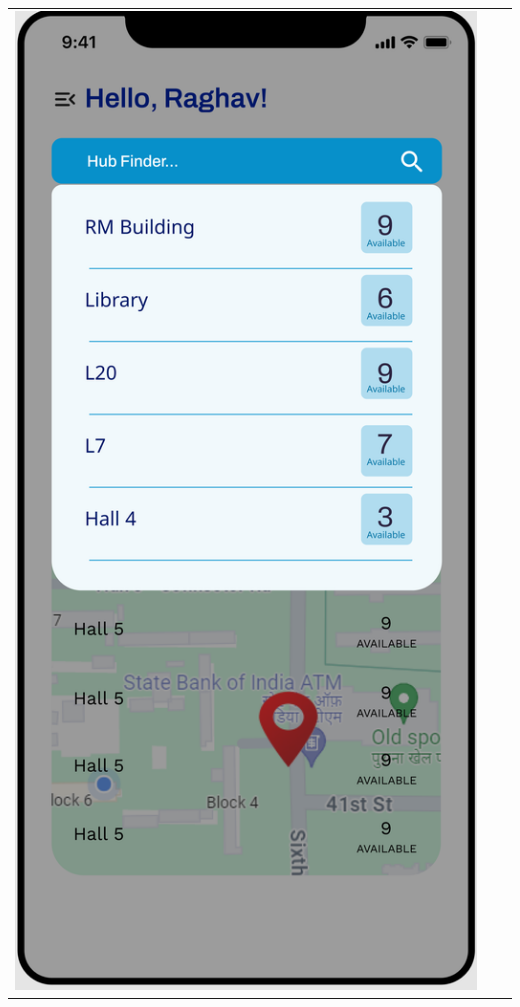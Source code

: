 \begin{center}
\begin{tabular}{ccc}
    \includegraphics[scale=0.1]{ui-images/HubSelection.png} &

\end{tabular}
\end{center}
